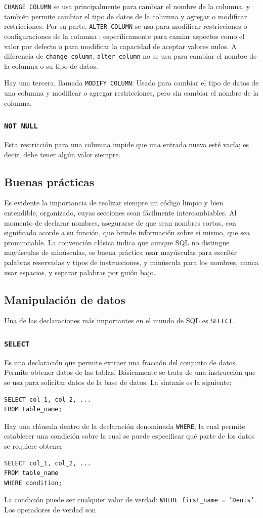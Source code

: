 \texttt{CHANGE COLUMN} se usa principalmente para cambiar el nombre de la columna, y también permite cambiar el tipo de datos de la columna y agregar o modificar restricciones.  Por su parte, \texttt{ALTER COLUMN} se usa para modificar restricciones o configuraciones de la columna ; específicamente para camiar aspectos como el valor por defecto o para modificar la capacidad de aceptar valores nulos. A diferencia de \texttt{change column}, \texttt{alter column} no se usa para cambiar el nombre de la columna o su tipo de datos.

Hay una tercera, llamada \verb|MODIFY COLUMN|: Usado para cambiar el tipo de datos de una columna y modificar o agregar restricciones, pero sin cambiar el nombre de la columna.

\subsubsection{\texttt{NOT NULL}}
Esta restricción para una columna impide que una entrada nueva esté vacía; es decir, debe tener algún valor siempre. 

\subsection{Buenas prácticas}

Es evidente la importancia de realizar siempre un código limpio y bien entendible, organizado, cuyas secciones sean fácilmente intercambiables. Al momento de declarar nombres, asegurarse de que sean nombres cortos, con significado acorde a su función, que brinde información sobre sí mismo, que sea pronunciable. 
La convención clásica indica que aunque SQL no distingue mayúsculas de minúsculas, es buena práctica usar mayúsculas para escribir palabras reservadas y tipos de instrucciones, y minúscula para los nombres, nunca usar espacios, y separar palabras por guión bajo.
\subsection{Manipulación de datos}

 Una de las declaraciones más importantes en el mundo de SQL es \texttt{SELECT}. 
\subsubsection{ \texttt{SELECT}}
 Es una declaración que permite extraer una fracción del conjunto de datos. Permite obtener datos de las tablas. Básicamente se trata de una instrucción que se usa para solicitar datos de la base de datos. La sintaxis es la siguiente:
 \begin{verbatim}
SELECT col_1, col_2, ...
FROM table_name;
 \end{verbatim}
 Hay una cláusula dentro de la declaración denominada \texttt{WHERE}, la cual permite establecer una condición sobre la cual se puede especificar qué parte de los datos se requiere obtener
  \begin{verbatim}
SELECT col_1, col_2, ...
FROM table_name
WHERE condition;
 \end{verbatim}
 La condición puede ser cualquier valor de verdad: \texttt{WHERE first\_name = 'Denis'}. Los operadores de verdad son 

